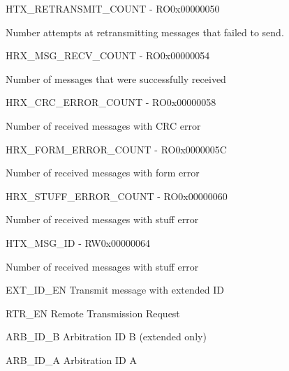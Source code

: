 \documentclass{article}
\begin{document}
\begin{register}{H}{TX{\_}RETRANSMIT{\_}COUNT - RO}{0x00000050}  \par Number attempts at retransmitting messages that failed to send. \regnewline
  \label{TX_RETRANSMIT_COUNT}
\regnewline
\end{register}

\begin{register}{H}{RX{\_}MSG{\_}RECV{\_}COUNT - RO}{0x00000054}  \par Number of messages that were successfully received \regnewline
  \label{RX_MSG_RECV_COUNT}
\regnewline
\end{register}

\begin{register}{H}{RX{\_}CRC{\_}ERROR{\_}COUNT - RO}{0x00000058}  \par Number of received messages with CRC error \regnewline
  \label{RX_CRC_ERROR_COUNT}
\regnewline
\end{register}

\begin{register}{H}{RX{\_}FORM{\_}ERROR{\_}COUNT - RO}{0x0000005C}  \par Number of received messages with form error \regnewline
  \label{RX_FORM_ERROR_COUNT}
\regnewline
\end{register}

\begin{register}{H}{RX{\_}STUFF{\_}ERROR{\_}COUNT - RO}{0x00000060}  \par Number of received messages with stuff error \regnewline
  \label{RX_STUFF_ERROR_COUNT}
\regnewline
\end{register}

\begin{register}{H}{TX{\_}MSG{\_}ID - RW}{0x00000064}  \par Number of received messages with stuff error \regnewline
  \label{TX_MSG_ID}
\regnewline
  \begin{regdesc}\begin{reglist}[EXT{\_}ID{\_}EN]
    \item [EXT{\_}ID{\_}EN] Transmit message with extended ID    \item [RTR{\_}EN] Remote Transmission Request    \item [ARB{\_}ID{\_}B] Arbitration ID B (extended only)    \item [ARB{\_}ID{\_}A] Arbitration ID A  \end{reglist}\end{regdesc}
\end{register}
\end{document}
